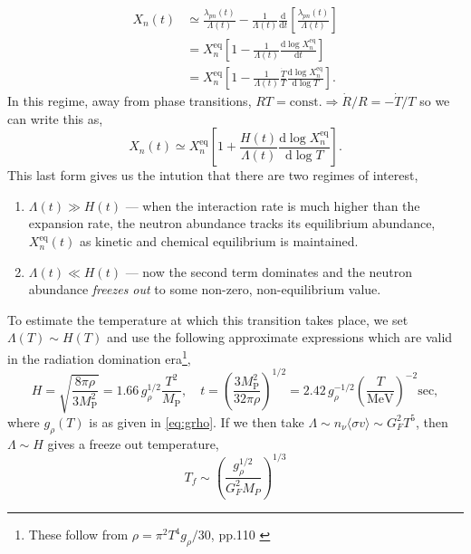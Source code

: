 \documentclass[11pt]{article}
\numberwithin{equation}{section}
\numberwithin{figure}{section}
\numberwithin{table}{section}
\begin{document}
\begin{align*}
X_n(t) &\simeq \frac{\lambda_{pn}(t)}{\Lambda(t)} - \frac{1}{\Lambda(t)} \frac{\mathrm{d}}{\mathrm{d}t}\left[\frac{\lambda_{pn}(t)}{\Lambda(t)}\right] \\
&= X_n^{\mathrm{eq}}\left[1 - \frac{1}{\Lambda(t)} \frac{\mathrm{d}\log X_n^{\mathrm{eq}}}{\mathrm{d}t}\right] \\
&= X_n^{\mathrm{eq}}\left[1 - \frac{1}{\Lambda(t)} \frac{\dot{T}}{T}\frac{\mathrm{d}\log X_n^{\mathrm{eq}}}{\mathrm{d} \log T}\right].
\end{align*}
In this regime, away from phase transitions, $RT = \mathrm{const.} \Rightarrow \dot{R}/R = -\dot{T}/T$ so we can write this as,
\begin{equation}
X_n(t) \simeq X_n^{\mathrm{eq}}\left[1 + \frac{H(t)}{\Lambda(t)} \frac{\mathrm{d}\log X_n^{\mathrm{eq}}}{\mathrm{d} \log T}\right].
\end{equation}
This last form gives us the intution that there are two regimes of interest,
\begin{enumerate}
\item $\Lambda(t) \gg H(t)$ --- when the interaction rate is much higher than the expansion rate, the neutron abundance tracks its equilibrium abundance, $X_n^{\mathrm{eq}}(t)$ as kinetic and chemical equilibrium is maintained.
\item $\Lambda(t) \ll H(t)$ --- now the second term dominates and the neutron abundance \textit{freezes out} to some non-zero, non-equilibrium value.
\end{enumerate}
To estimate the temperature at which this transition takes place, we set $\Lambda(T) \sim H(T)$ and use the following approximate expressions which are valid in the radiation domination era\footnote{These follow from $\rho = \pi^2 T^4 g_{\rho}/30$, pp.110 \citet{Bernstein:1988bw}},
\begin{equation}
H=\sqrt{\frac{8 \pi \rho}{3 M_{\mathrm{P}}^{2}}}=1.66 \, g_{\rho}^{1 / 2} \frac{T^{2}}{M_{\mathrm{P}}}, \quad t=\left(\frac{3 M_{\mathrm{P}}^{2}}{32 \pi \rho}\right)^{1 / 2}=2.42 \, g_{\rho}^{-1 / 2}\left(\frac{T}{\mathrm{MeV}}\right)^{-2} \mathrm{sec}, \label{eq:Ht}
\end{equation}
where $g_{\rho}(T)$ is as given in \eqref{eq:grho}. If we then take $\Lambda \sim n_\nu \langle \sigma v \rangle \sim G_F^2 T^5$, then $\Lambda \sim H$ gives a freeze out temperature,
\begin{equation}
T_f \sim \left(\frac{g^{1/2}_\rho}{G_F^2 M_P}\right)^{1/3}
\end{equation}
\end{document}
